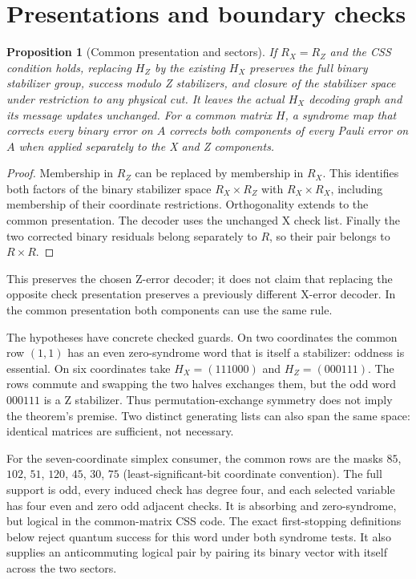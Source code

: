 \documentclass[11pt]{article}
\newtheorem{proposition}[theorem]{Proposition}
\begin{document}
\section{Presentations and boundary checks}
\begin{proposition}[Common presentation and sectors]\label{prop:presentation}
If $R_X=R_Z$ and the CSS condition holds, replacing $H_Z$ by the existing $H_X$ preserves the full binary stabilizer group, success modulo Z stabilizers, and closure of the stabilizer space under restriction to any physical cut. It leaves the actual $H_X$ decoding graph and its message updates unchanged. For a common matrix $H$, a syndrome map that corrects every binary error on $A$ corrects both components of every Pauli error on $A$ when applied separately to the X and Z components.
\end{proposition}
\begin{proof}
Membership in $R_Z$ can be replaced by membership in $R_X$. This identifies both factors of the binary stabilizer space $R_X\times R_Z$ with $R_X\times R_X$, including membership of their coordinate restrictions. Orthogonality extends to the common presentation. The decoder uses the unchanged X check list. Finally the two corrected binary residuals belong separately to $R$, so their pair belongs to $R\times R$.
\end{proof}
This preserves the chosen Z-error decoder; it does not claim that replacing the opposite check presentation preserves a previously different X-error decoder. In the common presentation both components can use the same rule.

The hypotheses have concrete checked guards. On two coordinates the common row $(1,1)$ has an even zero-syndrome word that is itself a stabilizer: oddness is essential. On six coordinates take $H_X=(111000)$ and $H_Z=(000111)$. The rows commute and swapping the two halves exchanges them, but the odd word $000111$ is a Z stabilizer. Thus permutation-exchange symmetry does not imply the theorem's premise. Two distinct generating lists can also span the same space: identical matrices are sufficient, not necessary.

For the seven-coordinate simplex consumer, the common rows are the masks $85$, $102$, $51$, $120$, $45$, $30$, $75$ (least-significant-bit coordinate convention). The full support is odd, every induced check has degree four, and each selected variable has four even and zero odd adjacent checks. It is absorbing and zero-syndrome, but logical in the common-matrix CSS code. The exact first-stopping definitions below reject quantum success for this word under both syndrome tests. It also supplies an anticommuting logical pair by pairing its binary vector with itself across the two sectors.
\end{document}
